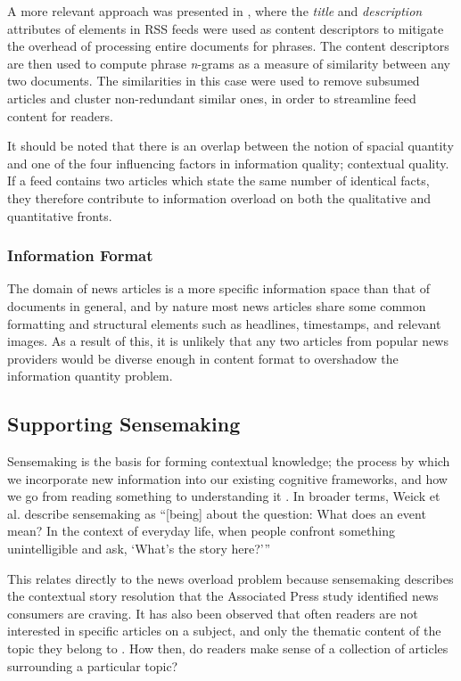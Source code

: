 A more relevant approach was presented in \citep{UtilizingPhraseSimilarityMeasures}, where the \textit{title} and \textit{description} attributes of elements in RSS feeds were used as content descriptors to mitigate the overhead of processing entire documents for phrases. The content descriptors are then used to compute phrase \textit{n}-grams as a measure of similarity between any two documents. The similarities in this case were used to remove subsumed articles and cluster non-redundant similar ones, in order to streamline feed content for readers.

It should be noted that there is an overlap between the notion of spacial quantity and one of the four influencing factors in information quality; contextual quality. If a feed contains two articles which state the same number of identical facts, they therefore contribute to information overload on both the qualitative and quantitative fronts.

\subsubsection{Information Format}
The domain of news articles is a more specific information space than that of documents in general, and by nature most news articles share some common formatting and structural elements such as headlines, timestamps, and relevant images. As a result of this, it is unlikely that any two articles from popular news providers would be diverse enough in content format to overshadow the information quantity problem.

\subsection{Supporting Sensemaking}

Sensemaking is the basis for forming contextual knowledge; the process by which we incorporate new information into our existing cognitive frameworks, and how we go from reading something to understanding it \citep{FromInformationToKnowing}. In broader terms, Weick et al. describe sensemaking as ``[being] about the question: What does an event mean? In the context of everyday life, when people confront something unintelligible and ask, `What's the story here?'{}'' \citep[p.85]{OrganizingAndTheProcessOfSensemaking} 

This relates directly to the news overload problem because sensemaking describes the contextual story resolution that the Associated Press study \citep{anewmodelfornews} identified news consumers are craving. It has also been observed that often readers are not interested in specific articles on a subject, and only the thematic content of the topic they belong to \citep{AnalysingUserAccessToAnOnlineNewspaper}. How then, do readers make sense of a collection of articles surrounding a particular topic?

